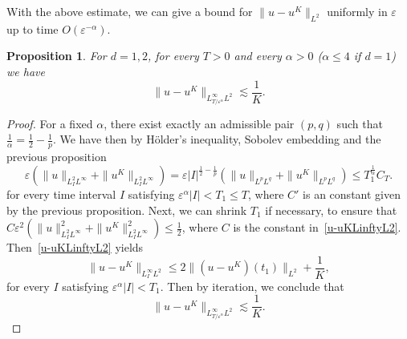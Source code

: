 \documentclass[10pt,a4paper]{article}
\newtheorem{proposition}[theorem]{Proposition}
\begin{document}
  With the above estimate, we can give a bound for \(\|u-u^K\|_{L^2}\) uniformly
  in \(\varepsilon\) up to time \(O(\varepsilon^{-\alpha})\).

  \begin{proposition}\label{u-uKLinftyL2d12}
    For \(d=1,2\), for every \(T>0\) and every \(\alpha>0\) (\(\alpha \leq 4\) if \(d=1\)) 
    we have 
    \begin{equation}
      \|u-u^K\|_{L^\infty_{T/\varepsilon^\alpha}L^2} \lesssim \frac1K.
    \end{equation}
  \end{proposition}

  \begin{proof}
    For a fixed \(\alpha\), there exist exactly an admissible pair \((p,q)\) such 
    that \(\frac1\alpha = \frac12 - \frac1p\). We have then by H\"older's 
    inequality, Sobolev embedding and the previous proposition 
    \begin{equation}\label{uL2Linfty}
      \varepsilon (\|u\|_{L^2_I L^\infty} + \|u^K\|_{L^2_I L^\infty}) = 
      \varepsilon |I|^{\frac12-\frac1p} (\|u\|_{L^p L^q} + \|u^K\|_{L^p L^q}) 
      \leq T_1^{\frac1\alpha} C_T.
    \end{equation}
    for every time interval \(I\) satisfying \(\varepsilon^\alpha |I| <
    T_1 \leq T\), where \(C'\) is an constant given by the previous proposition.
    Next, we can shrink \(T_1\) if necessary, to ensure that
    \(C\varepsilon^2 (\|u\|_{L^2_I L^\infty}^2 + \|u^K\|_{L^2_I L^\infty}^2)
    \leq \frac12\), where \(C\) is the constant in~\eqref{u-uKLinftyL2}. 
    Then~\eqref{u-uKLinftyL2} yields 
    \[ \|u-u^K\|_{L^\infty_I L^2} \leq 2\|(u-u^K)(t_1)\|_{L^2} + \frac1K, \]
    for every \(I\) satisfying \(\varepsilon^\alpha |I| < T_1\). Then by
    iteration, we conclude that 
    \[ \|u-u^K\|_{L^\infty_{T/\varepsilon^\alpha}L^2} \lesssim \frac1K. \]
  \end{proof}
\end{document}
